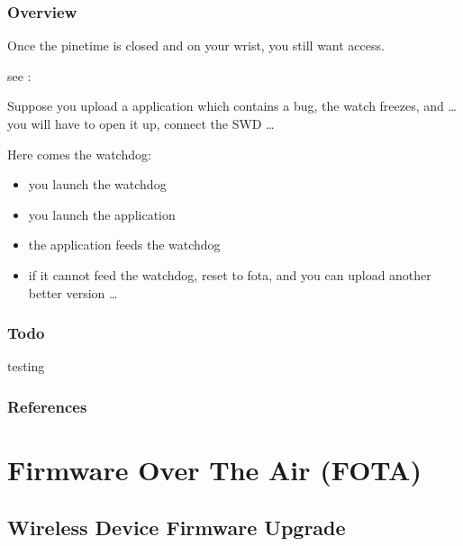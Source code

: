 \documentclass[letterpaper,10pt,english]{sphinxmanual}
\begin{document}
\subsection{Overview}
\label{\detokenize{drivers/watchdog:overview}}
Once the pinetime is closed and on your wrist, you still want access.

see : {\hyperref[\detokenize{fota/fota:fota}]{}}

Suppose you upload a application which contains a bug, the watch freezes, and … you will have to open it up, connect the SWD …

Here comes the watchdog:
\begin{itemize}
\item {} 
you launch the watchdog

\item {} 
you launch the application

\item {} 
the application feeds the watchdog

\item {} 
if it cannot feed the watchdog, reset to fota, and you can upload another better version …

\end{itemize}


\subsection{Todo}
\label{\detokenize{drivers/watchdog:todo}}
testing


\subsection{References}
\label{\detokenize{drivers/watchdog:references}}

\chapter{Firmware Over The Air (FOTA)}
\label{\detokenize{fota/fota:firmware-over-the-air-fota}}\label{\detokenize{fota/fota:fota}}\label{\detokenize{fota/fota::doc}}

\section{Wireless Device Firmware Upgrade}
\label{\detokenize{fota/mcuboot:wireless-device-firmware-upgrade}}\label{\detokenize{fota/mcuboot:mcuboot}}\label{\detokenize{fota/mcuboot::doc}}
\end{document}
